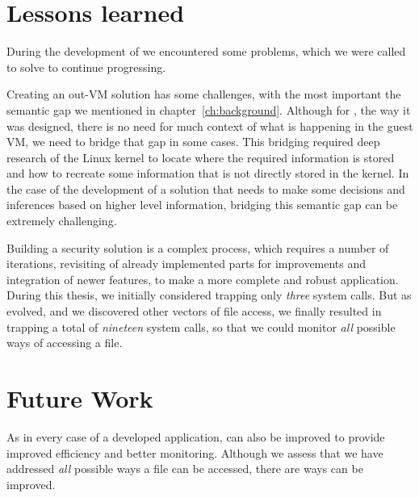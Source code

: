 \section{Lessons learned}

\par During the development of  we encountered some problems, which we were called to solve to continue progressing.  

\par Creating an out-\ac{VM} solution has some challenges, with the most important the semantic gap we mentioned in chapter~\ref{ch:background}. Although for , the way it was designed, there is no need for much context of what is happening in the guest \ac{VM}, we need to bridge that gap in some cases. This bridging required deep research of the Linux kernel to locate where the required information is stored and how to recreate some information that is not directly stored in the kernel. In the case of the development of a solution that needs to make some decisions and inferences based on higher level information, bridging this semantic gap can be extremely challenging.

\par Building a security solution is a complex process, which requires a number of iterations, revisiting of already implemented parts for improvements and integration of newer features, to make a more complete and robust application. During this thesis, we initially considered trapping only \emph{three} system calls. But as  evolved, and we discovered other vectors of file access, we finally resulted in trapping a total of \emph{nineteen} system calls, so that we could monitor \emph{all} possible ways of accessing a file.


\section{Future Work}

\par As in every case of a developed application,  can also be improved to provide improved efficiency and better monitoring. Although we assess that we have addressed \emph{all} possible ways a file can be accessed, there are ways  can be improved.

